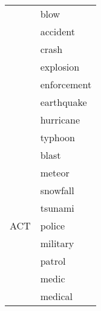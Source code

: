 \begin{center}
\begin{longtable}{rl}
                        & blow                                                                                     \\
                        & accident                                                                                 \\
                        & crash                                                                                    \\
                        & explosion                                                                                \\
                        & enforcement                                                                              \\
                        & earthquake                                                                               \\
                        & hurricane                                                                                \\
                        & typhoon                                                                                  \\
                        & blast                                                                                    \\
                        & meteor                                                                                   \\
                        & snowfall                                                                                 \\
                        & tsunami                                                                                  \\
        ACT             & police                                                                                   \\
                        & military                                                                                 \\
                        & patrol                                                                                   \\
                        & medic                                                                                    \\
                        & medical                                                                                  \\

\end{longtable}
\end{center}
